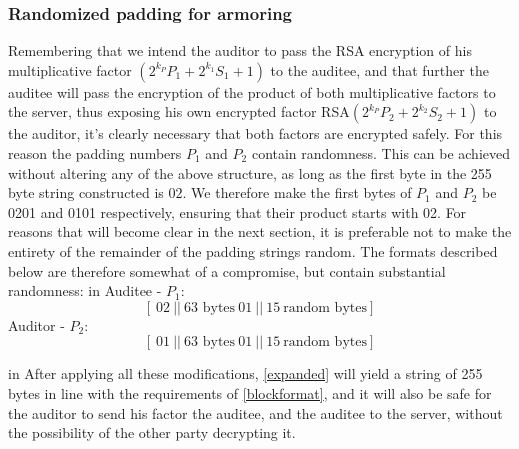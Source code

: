 \documentclass[10pt,a4paper]{article}
\begin{document}
\subsubsection{Randomized padding for armoring}
\noindent Remembering that we intend the auditor to pass the RSA encryption of his multiplicative factor $(2^{k_P}P_1+2^{k_1}S_1+1)$ to the auditee, and that further the auditee will pass the encryption of the product of both multiplicative factors to the server, thus exposing his own encrypted factor RSA$(2^{k_P}P_2+2^{k_2}S_2+1)$ to the auditor, it's clearly necessary that both factors are encrypted safely. For this reason the padding numbers $P_1$ and $P_2$ contain randomness. This can be achieved without altering any of the above structure, as long as the first byte in the 255 byte string constructed is $02$. We therefore make the first bytes of $P_1$ and $P_2$ be 0201 and 0101 respectively, ensuring that their product starts with 02. For reasons that will become clear in the next section, it is preferable not to make the entirety of the remainder of the padding strings random. The formats described below are therefore somewhat of a compromise, but contain substantial randomness:
 in 
\noindent Auditee - $P_1$:
\begin{equation}\label{auditee_padding}
[ \ 02\ ||\ \textrm{63 bytes}\ 01\ ||\ 15\ \textrm{random bytes} ] 
\end{equation}
\noindent Auditor - $P_2$:
\begin{equation}\label{auditor_padding}
[\ 01\ ||\ \textrm{63 bytes}\ 01\ ||\ 15\ \textrm{random bytes} ] 
\end{equation}

 in 
\noindent After applying all these modifications, \eqref{expanded} will yield a string of 255 bytes in line with the requirements of \eqref{blockformat}, and it will also be safe for the auditor to send his factor the auditee, and the auditee to the server, without the possibility of the other party decrypting it.
\end{document}
